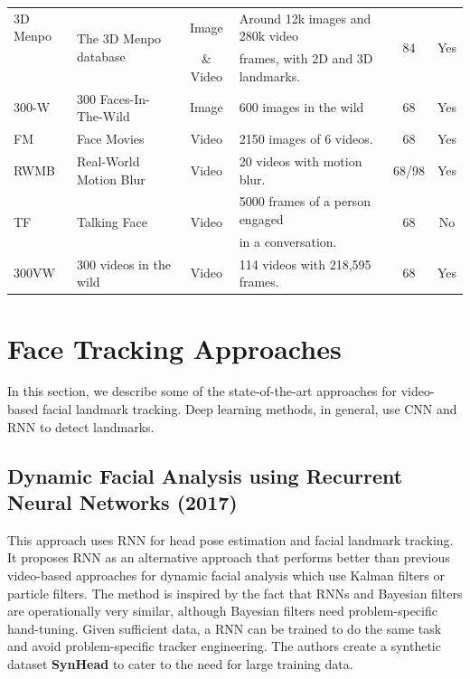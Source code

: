 \documentclass{llncs}
\begin{document}
\begin{table}[]
\begin{center}
\begin{tabular}{|l|l|c|l|c|c|}
				3D Menpo & \multirow{2}{*}{The 3D Menpo database} & Image & Around 12k images and 280k video & \multirow{2}{*}{84} & \multirow{2}{*}{Yes} \\
				\cite{3d_menpo} & & \& Video & frames, with 2D and 3D landmarks. & & \\
				\hline
				
				300-W\cite{300-W} & 300 Faces-In-The-Wild & Image & 600 images in the wild & 68 & Yes \\
				\hline
				
				FM\cite{fm} & Face Movies & Video & 2150 images of 6 videos. & 68 & Yes \\
				\hline
				
				RWMB\cite{fab} & Real-World Motion Blur & Video & 20 videos with motion blur. & 68/98 & Yes \\
				\hline
				
				\multirow{2}{*}{TF\cite{tf}} & \multirow{2}{*}{Talking Face} & \multirow{2}{*}{Video} & 5000 frames of a person engaged & \multirow{2}{*}{68} & \multirow{2}{*}{No} \\
				& & & in a conversation. & & \\
				\hline
				
				300VW\cite{300-VW} & 300 videos in the wild & Video & 114 videos with 218,595 frames. & 68 & Yes \\
				\hline
			\end{tabular}
			\label{datasets}
		\end{center}
	\end{table}
	\vspace{-13mm}
	\section{Face Tracking Approaches}
	In this section, we describe some of the state-of-the-art approaches for video-based facial landmark tracking. Deep learning methods, in general, use CNN and RNN to detect landmarks.
	
	\subsection{Dynamic Facial Analysis using Recurrent Neural Networks (2017) \cite{dynamic_facial_analysis}}
This approach uses RNN for head pose estimation and facial landmark tracking.
It proposes RNN as an alternative approach that performs better than previous video-based approaches for dynamic facial analysis which use Kalman filters or particle filters. The method is inspired by the fact that RNNs and Bayesian filters are operationally very similar, although Bayesian filters need problem-specific hand-tuning. Given sufficient data, a RNN can be trained to do the same task and avoid problem-specific tracker engineering.
The authors create a synthetic dataset \textbf{SynHead} to cater to the need for large training data.
\end{document}
